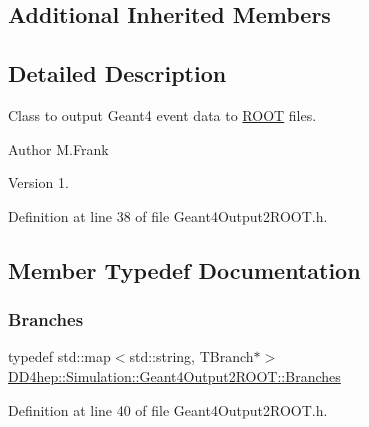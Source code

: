 \subsection*{Additional Inherited Members}


\subsection{Detailed Description}
Class to output Geant4 event data to \hyperlink{namespace_r_o_o_t}{R\+O\+OT} files. 

\begin{DoxyAuthor}{Author}
M.\+Frank 
\end{DoxyAuthor}
\begin{DoxyVersion}{Version}
1. 
\end{DoxyVersion}


Definition at line 38 of file Geant4\+Output2\+R\+O\+O\+T.\+h.



\subsection{Member Typedef Documentation}
\hypertarget{class_d_d4hep_1_1_simulation_1_1_geant4_output2_r_o_o_t_a7c5890a17d3f70ce65703cdbec3cf53c}{}\label{class_d_d4hep_1_1_simulation_1_1_geant4_output2_r_o_o_t_a7c5890a17d3f70ce65703cdbec3cf53c} 
\subsubsection{\texorpdfstring{Branches}{Branches}}
{\footnotesize\ttfamily typedef std\+::map$<$std\+::string, T\+Branch$\ast$$>$ \hyperlink{class_d_d4hep_1_1_simulation_1_1_geant4_output2_r_o_o_t_a7c5890a17d3f70ce65703cdbec3cf53c}{D\+D4hep\+::\+Simulation\+::\+Geant4\+Output2\+R\+O\+O\+T\+::\+Branches}\hspace{0.3cm}{\ttfamily [protected]}}



Definition at line 40 of file Geant4\+Output2\+R\+O\+O\+T.\+h.

\hypertarget{class_d_d4hep_1_1_simulation_1_1_geant4_output2_r_o_o_t_a6bee4e4ece80aae4e2e07295486f8cd0}{}\label{class_d_d4hep_1_1_simulation_1_1_geant4_output2_r_o_o_t_a6bee4e4ece80aae4e2e07295486f8cd0} 
